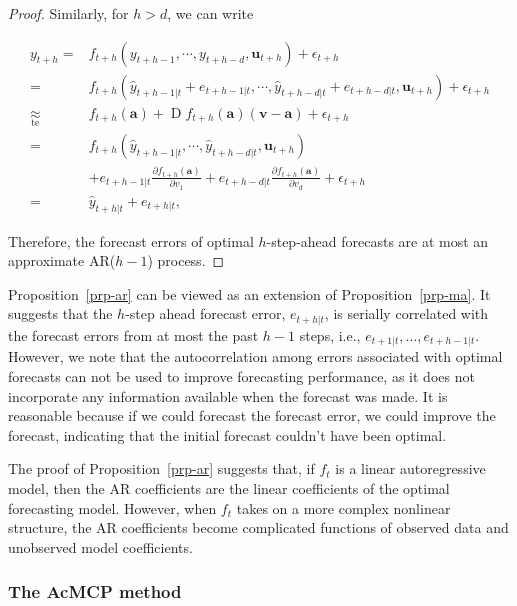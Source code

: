 \documentclass[
  11pt,
  a4paper,
]{article}
\theoremstyle{plain}
\theoremstyle{plain}
\theoremstyle{remark}
\begin{document}
\begin{proof}
Similarly, for \(h > d\), we can write

\[
\begin{aligned}
y_{t+h}
=&f_{t+h}\left(y_{t+h-1},\cdots,y_{t+h-d},\bm{u}_{t+h}\right)+\epsilon_{t+h} \\
=&f_{t+h}\left(\hat{y}_{t+h-1|t}+e_{t+h-1|t},\cdots,\hat{y}_{t+h-d|t}+e_{t+h-d|t},\bm{u}_{t+h}\right)+\epsilon_{t+h} \\
\underset{\text{te}}{\approx}&f_{t+h}\left(\bm{a}\right)+\operatorname{D}f_{t+h}\left(\bm{a}\right)\left(\bm{v}-\bm{a}\right)+
\epsilon_{t+h} \\
=&f_{t+h}\left(\hat{y}_{t+h-1|t},\cdots,\hat{y}_{t+h-d|t},\bm{u}_{t+h}\right) \\
&+e_{t+h-1|t}\frac{\partial f_{t+h}\left(\bm{a}\right)}{\partial v_1}+e_{t+h-d|t}\frac{\partial f_{t+h}\left(\bm{a}\right)}{\partial v_{d}}+\epsilon_{t+h} \\
=&\hat{y}_{t+h|t}+e_{t+h|t},
\end{aligned}
\]

Therefore, the forecast errors of optimal \(h\)-step-ahead forecasts are
at most an approximate AR(\(h-1\)) process.
\end{proof}

Proposition~\ref{prp-ar} can be viewed as an extension of
Proposition~\ref{prp-ma}. It suggests that the \(h\)-step ahead forecast
error, \(e_{t+h|t}\), is serially correlated with the forecast errors
from at most the past \(h-1\) steps, i.e.,
\(e_{t+1|t}, \ldots, e_{t+h-1|t}\). However, we note that the
autocorrelation among errors associated with optimal forecasts can not
be used to improve forecasting performance, as it does not incorporate
any information available when the forecast was made. It is reasonable
because if we could forecast the forecast error, we could improve the
forecast, indicating that the initial forecast couldn't have been
optimal.

The proof of Proposition~\ref{prp-ar} suggests that, if \(f_t\) is a
linear autoregressive model, then the AR coefficients are the linear
coefficients of the optimal forecasting model. However, when \(f_t\)
takes on a more complex nonlinear structure, the AR coefficients become
complicated functions of observed data and unobserved model
coefficients.

\subsubsection{The AcMCP method}\label{sec-novel}
\end{document}
